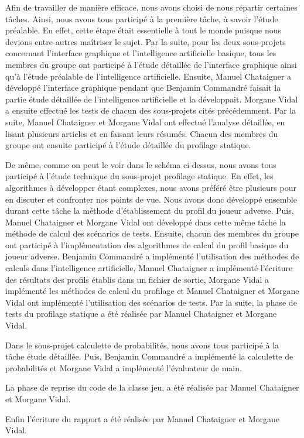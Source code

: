 \documentclass{report}
\begin{document}
\hspace{0.5cm}Afin de travailler de manière efficace, nous avons choisi de nous répartir certaines tâches. Ainsi, nous avons tous participé à la première tâche, à savoir l'étude préalable. En effet, cette étape était essentielle à tout le monde puisque nous devions entre-autres maîtriser le sujet. Par la suite, pour les deux sous-projets concernant l'interface graphique et l'intelligence artificielle basique, tous les membres du groupe ont participé à l'étude détaillée de l'interface graphique ainsi qu'à l'étude préalable de l'intelligence artificielle. Ensuite, Manuel Chataigner a développé l'interface graphique pendant que Benjamin Commandré faisait la partie étude détaillée de l'intelligence artificielle et la développait. Morgane Vidal a ensuite effectué les tests de chacun des sous-projets cités précédemment. Par la suite, Manuel Chataigner et Morgane Vidal ont effectué l'analyse détaillée, en lisant plusieurs articles et en faisant leurs résumés. Chacun des membres du groupe ont ensuite participé à l'étude détaillée du profilage statique. \par
De même, comme on peut le voir dans le schéma ci-dessus, nous avons tous participé à l'étude technique du sous-projet profilage statique. En effet, les algorithmes à développer étant complexes, nous avons préféré être plusieurs pour en discuter et confronter nos points de vue. Nous avons donc développé ensemble durant cette tâche la méthode d'établissement du profil du joueur adverse. Puis, Manuel Chataigner et Morgane Vidal ont développé dans cette même tâche la méthode de calcul des scénarios de tests. Ensuite, chacun des membres du groupe ont participé à l'implémentation des algorithmes de calcul du profil basique du joueur adverse. Benjamin Commandré a implémenté l'utilisation des méthodes de calculs dans l'intelligence artificielle, Manuel Chataigner a implémenté l'écriture des résultats des profils établis dans un fichier de sortie, Morgane Vidal a implémenté les méthodes de calcul du profilage et Manuel Chataigner et Morgane Vidal ont implémenté l'utilisation des scénarios de tests. 
Par la suite, la phase de tests du profilage statique a été réalisée par Manuel Chataigner et Morgane Vidal. \par
Dans le sous-projet calculette de probabilités, nous avons tous participé à la tâche étude détaillée. Puis, Benjamin Commandré a implémenté la calculette de probabilités et Morgane Vidal a implémenté l'évaluateur de main.\par
La phase de reprise du code de la classe jeu, a été réalisée par Manuel Chataigner et Morgane Vidal. \par
Enfin l'écriture du rapport a été réalisée par Manuel Chataigner et Morgane Vidal.\par
\end{document}
